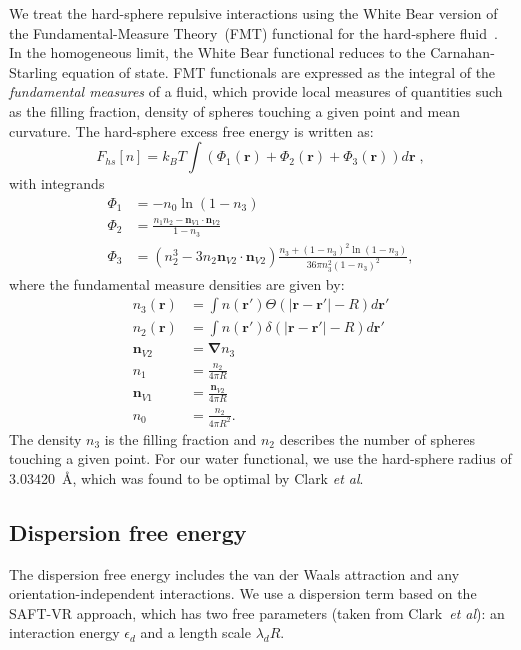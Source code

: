 \documentclass[letterpaper,twocolumn,amsmath,amssymb,prb]{revtex4-1}
\newcommand{\xx}{\textbf{r}}
\begin{document}
We treat the hard-sphere repulsive interactions using the White Bear version of
the Fundamental-Measure Theory~(FMT) functional for the hard-sphere
fluid~\cite{roth2002whitebear}.  In the homogeneous limit, the White
Bear functional reduces to the Carnahan-Starling
equation of state.  FMT functionals are expressed as the integral of
the \emph{fundamental measures} of a fluid, which provide local
measures of quantities such as the filling fraction, density of
spheres touching a given point and mean curvature.  The hard-sphere
excess free energy is written as:
\begin{equation}
F_{hs}[n] = k_B T \int (\Phi_1(\xx) + \Phi_2(\xx) + \Phi_3(\xx)) d\xx \; ,
\end{equation}
with integrands
\begin{align}
\Phi_1 &= -n_0 \ln\left( 1 - n_3\right)\\
\Phi_2 &= \frac{n_1 n_2 - \mathbf{n}_{V1} \cdot\mathbf{n}_{V2}}{1-n_3} \\
\Phi_3 &= (n_2^3 - 3n_2 \mathbf{n}_{V2} \cdot \mathbf{n}_{V2})
  \frac{
    n_3 + (1-n_3)^2\ln(1-n_3)
  }{
    36\pi n_3^2\left( 1 - n_3 \right)^2
  } ,
\end{align}
where the fundamental measure densities are given by:
\begin{align}
  n_3(\xx) &= \int n(\xx') \Theta(\left|\xx - \xx'\right| - R) d\xx' \\
  n_2(\xx) &= \int n(\xx') \delta(\left|\xx - \xx'\right| - R) d\xx'
  \\
  \mathbf{n}_{V2} &= \mathbf{\nabla} n_3 \\
  n_1 &= \frac{n_2}{4\pi R}\\
  \mathbf{n}_{V1} &= \frac{\mathbf{n}_{V2}}{4\pi R}\\
  n_0 &= \frac{n_2}{4\pi R^2}.
\end{align}
The density $n_3$ is the filling fraction and $n_2$ describes the number
of spheres touching a given point. For our water functional, we use the 
hard-sphere radius of
3.03420~\AA, which was found to be optimal by Clark
\emph{et al}.\cite{clark2006developing}

\newcommand\etadisp{\ensuremath{\eta_\textit{d}}}
\newcommand\epsilondisp{\ensuremath{\epsilon_\textit{d}}}
\newcommand\epsilonassoc{\ensuremath{\epsilon_\textit{a}}}
\newcommand\kappaassoc{\ensuremath{\kappa_\textit{a}}}
\newcommand\lambdadisp{\ensuremath{\lambda_\textit{d}}}
\newcommand\lscale{\ensuremath{s_d}}
\subsection{Dispersion free energy}
The dispersion free energy includes the van der Waals attraction and
any orientation-independent interactions. We use a dispersion term
based on the SAFT-VR approach\cite{gil-villegas-1997-SAFT-VR}, which
has two free parameters (taken from Clark~\emph{et
  al}\cite{clark2006developing}): an interaction energy $\epsilondisp$
and a length scale $\lambdadisp R$.
\end{document}
